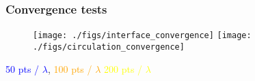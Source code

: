 \begin{frame}\frametitle{Convergence tests}
  \begin{figure}
    \centering
    \texttt{[image: ./figs/interface\_convergence]}
    \texttt{[image: ./figs/circulation\_convergence]}
  \end{figure}
\textcolor{blue}{50 pts / $\lambda$}, \qquad \textcolor{orange}{100 pts / $\lambda$} \qquad \textcolor{yellow}{200 pts / $\lambda$}
\end{frame}

